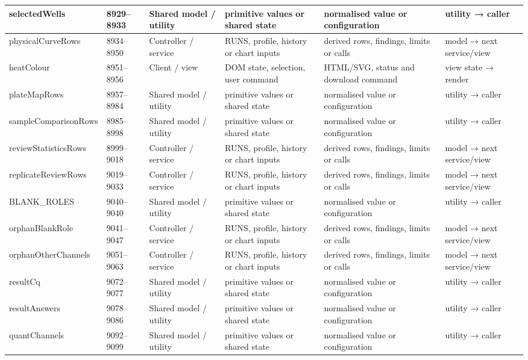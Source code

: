 \begin{landscape}
\begin{longtable}{@{}p{3.2cm}p{1.45cm}p{2.7cm}p{4.0cm}p{4.0cm}p{3.0cm}@{}}
selectedWells & 8929--8933 & Shared model / utility & primitive values or shared state & normalised value or configuration & utility → caller \\\hline
physicalCurveRows & 8934--8950 & Controller / service & RUNS, profile, history or chart inputs & derived rows, findings, limits or calls & model → next service/view \\\hline
heatColour & 8951--8956 & Client / view & DOM state, selection, user command & HTML/SVG, status and download command & view state → render \\\hline
plateMapRows & 8957--8984 & Shared model / utility & primitive values or shared state & normalised value or configuration & utility → caller \\\hline
sampleComparisonRows & 8985--8998 & Shared model / utility & primitive values or shared state & normalised value or configuration & utility → caller \\\hline
reviewStatisticsRows & 8999--9018 & Controller / service & RUNS, profile, history or chart inputs & derived rows, findings, limits or calls & model → next service/view \\\hline
replicateReviewRows & 9019--9033 & Controller / service & RUNS, profile, history or chart inputs & derived rows, findings, limits or calls & model → next service/view \\\hline
BLANK\_ROLES & 9040--9040 & Shared model / utility & primitive values or shared state & normalised value or configuration & utility → caller \\\hline
orphanBlankRole & 9041--9047 & Controller / service & RUNS, profile, history or chart inputs & derived rows, findings, limits or calls & model → next service/view \\\hline
orphanOtherChannels & 9051--9063 & Controller / service & RUNS, profile, history or chart inputs & derived rows, findings, limits or calls & model → next service/view \\\hline
resultCq & 9072--9077 & Shared model / utility & primitive values or shared state & normalised value or configuration & utility → caller \\\hline
resultAnswers & 9078--9086 & Shared model / utility & primitive values or shared state & normalised value or configuration & utility → caller \\\hline
quantChannels & 9092--9099 & Shared model / utility & primitive values or shared state & normalised value or configuration & utility → caller \\\hline

\end{longtable}
\end{landscape}

